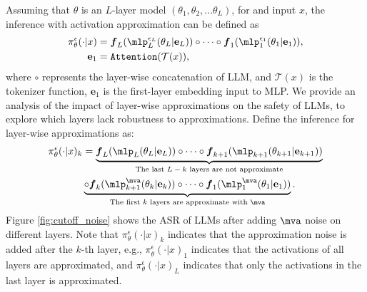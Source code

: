 Assuming that $\theta$ is an $L$-layer model $(\theta_1, \theta_2, ... \theta_L)$, for and input $x$, the inference with activation approximation can be defined as
\begin{align*}
\pi^{\epsilon}_\theta(\cdot|x) &= 
    \boldsymbol{f}_L(\mlp_L^{\epsilon_L}(\theta_L|\mathbf{e}_{L})) \circ 
    \dots \circ 
    \boldsymbol{f}_1(\mlp_1^{\epsilon_1}(\theta_1|\mathbf{e}_1)), \\
    \mathbf{e}_1 &= \texttt{Attention}(\mathcal{T}(x)),
\end{align*}
where $\circ$ represents the layer-wise concatenation of LLM, and $\mathcal{T}(x)$ is the tokenizer function, $\mathbf{e}_1$ is the first-layer embedding input to MLP. We provide an analysis of the impact of layer-wise approximations on the safety of LLMs, to explore which layers lack robustness to approximations. Define the inference for layer-wise approximations as:
\begin{align*}
\pi^{\epsilon}_\theta(\cdot|x)_k &= 
\underbrace{\boldsymbol{f}_L(\mlp_L(\theta_L|\mathbf{e}_{L})) \circ 
    \dots \circ 
    \boldsymbol{f}_{k+1}(\mlp_{k+1}(\theta_{k+1}|\mathbf{e}_{k+1}))}_{\text{The last $L-k$ layers are not approximate}} \\
    &  \underbrace{\circ \boldsymbol{f}_k(\mlp_{k+1}^{\mva}(\theta_k|\mathbf{e}_k))  \circ 
    \dots \circ \boldsymbol{f}_1(\mlp_{1}^{\mva}(\theta_1|\mathbf{e}_1))}_{\text{The first $k$ layers are approximate with }\mva}.
\end{align*}
Figure \ref{fig:cutoff_noise} shows the ASR of LLMs after adding $\mva$ noise on different layers. Note that $\pi^{\epsilon}_\theta(\cdot|x)_k$ indicates that the approximation noise is added after the $k$-th layer, e.g., $\pi^{\epsilon}_\theta(\cdot|x)_1$ indicates that the activations of all layers are approximated, and $\pi^{\epsilon}_\theta(\cdot|x)_{L}$ indicates that only the activations in the last layer is approximated.

